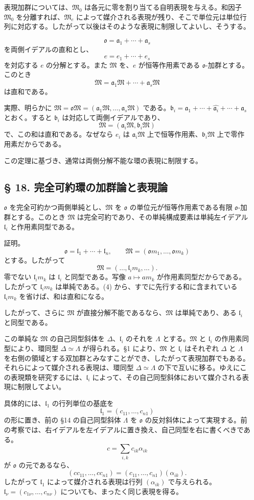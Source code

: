 \documentclass[11pt]{article}
\providecommand{\mM}{\mathfrak{M}}
\providecommand{\mo}{\mathfrak{o}}
\providecommand{\ma}{\mathfrak{a}}
\providecommand{\mb}{\mathfrak{b}}
\providecommand{\ml}{\mathfrak{l}}
\begin{document}
表現加群については、$\mM_0$ は各元に零を割り当てる自明表現を与える。和因子 $\mM_0$ を分離すれば、$\mM_e$ によって媒介される表現が残り、そこで単位元は単位行列に対応する。したがって以後はそのような表現に制限してよいし、そうする。

\[
        \mo=\ma_1+\cdots+\ma_s
\]
を両側イデアルの直和とし、
\[
        e=e_1+\cdots+e_s
\]
を対応する $e$ の分解とする。また $\mM$ を、$e$ が恒等作用素である $\mo$-加群とする。このとき
\[
        \mM=\ma_1\mM+\cdots+\ma_s\mM
\]
は直和である。

実際、明らかに $\mM=\mo\mM=(\ma_1\mM,\ldots,\ma_s\mM)$ である。$\mb_i=\ma_1+\cdots+\widehat{\ma_i}+\cdots+\ma_s$ とおく。すると $\mb_i$ は対応して両側イデアルであり、
\[
        \mM=(\ma_i\mM,\mb_i\mM)
\]
で、この和は直和である。なぜなら $e_i$ は $\ma_i\mM$ 上で恒等作用素、$\mb_i\mM$ 上で零作用素だからである。

この定理に基づき、通常は両側分解不能な環の表現に制限する。

\subsection*{§ 18. 完全可約環の加群論と表現論}

$\mo$ を完全可約かつ両側単純とし、$\mM$ を $\mo$ の単位元が恒等作用素である有限 $\mo$-加群とする。このとき $\mM$ は完全可約であり、その単純構成要素は単純左イデアル $\ml_i$ と作用素同型である。

証明。
\[
        \mo=\ml_1+\cdots+\ml_n,
        \qquad
        \mM=(\mo m_1,\ldots,\mo m_k)
\]
とする。したがって
\[
        \mM=(\ldots,\ml_i m_k,\ldots).                         \tag{4}
\]
零でない $\ml_i m_k$ は $\ml_i$ と同型である。写像 $a\mapsto am_k$ が作用素同型だからである。したがって $\ml_i m_k$ は単純である。(4) から、すでに先行する和に含まれている $\ml_i m_k$ を省けば、和は直和になる。

したがって、さらに $\mM$ が直接分解不能であるなら、$\mM$ は単純であり、ある $\ml_i$ と同型である。

この単純な $\mM$ の自己同型斜体を $\Delta$、$\ml_i$ のそれを $\Lambda$ とする。$\mM$ と $\ml_i$ の作用素同型により、環同型 $\Delta\simeq\Lambda$ が得られる。§1 により、$\mM$ と $\ml_i$ はそれぞれ $\Delta$ と $\Lambda$ を右側の領域とする双加群とみなすことができ、したがって表現加群でもある。それらによって媒介される表現は、環同型 $\Delta\simeq\Lambda$ の下で互いに移る。ゆえにこの表現類を研究するには、$\ml_i$ によって、その自己同型斜体において媒介される表現に制限してよい。

具体的には、$\ml_1$ の行列単位の基底を
\[
        \ml_1=(c_{11},\ldots,c_{n1})
\]
の形に置き、前の §14 の自己同型斜体 $\Lambda$ を $\mo$ の反対斜体によって実現する。前の考察では、右イデアルを左イデアルに置き換え、自己同型を右に書くべきである。
\[
        c=\sum_{i,k}c_{ik}\alpha_{ik}
\]
が $\mo$ の元であるなら、
\[
        (cc_{11},\ldots,cc_{n1})=(c_{11},\ldots,c_{n1})(\alpha_{ik}).
\]
したがって $\ml_1$ によって媒介される表現は行列 $(\alpha_{ik})$ で与えられる。$\ml_\nu=(c_{1\nu},\ldots,c_{n\nu})$ についても、まったく同じ表現を得る。
\end{document}
